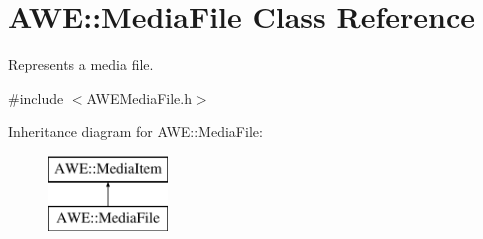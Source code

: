 \hypertarget{class_a_w_e_1_1_media_file}{\section{A\-W\-E\-:\-:Media\-File Class Reference}
\label{class_a_w_e_1_1_media_file}
}


Represents a media file.  




{\ttfamily \#include $<$A\-W\-E\-Media\-File.\-h$>$}

Inheritance diagram for A\-W\-E\-:\-:Media\-File\-:\begin{figure}[H]
\begin{center}
\leavevmode
\includegraphics[height=2.000000cm]{class_a_w_e_1_1_media_file}
\end{center}
\end{figure}
